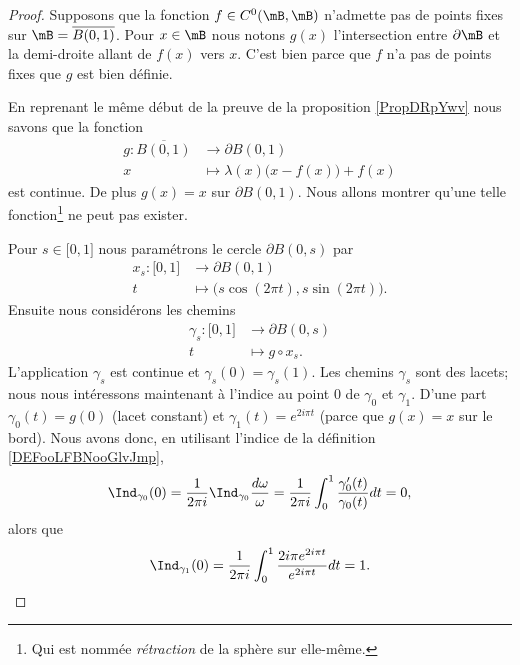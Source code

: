 \begin{proof}
    Supposons que la fonction \( f\in C^0(\mB,\mB)\) n'admette pas de points fixes sur \( \mB=\overline{ B(0,1) }\). Pour \( x\in \mB\) nous notons \( g(x)\) l'intersection entre \( \partial \mB\) et la demi-droite allant de \( f(x)\) vers \( x\). C'est bien parce que \( f\) n'a pas de points fixes que \( g\) est bien définie.

    En reprenant le même début de la preuve de la proposition \ref{PropDRpYwv} nous savons que la fonction
    \begin{equation}
        \begin{aligned}
            g\colon \overline{ B(0,1) }&\to \partial B(0,1) \\
            x&\mapsto \lambda(x)\big( x-f(x) \big)+f(x) 
        \end{aligned}
    \end{equation}
    est continue. De plus \( g(x)=x\) sur \( \partial B(0,1)\). Nous allons montrer qu'une telle fonction\footnote{Qui est nommée \emph{rétraction} de la sphère sur elle-même.} ne peut pas exister.

    Pour \( s\in\mathopen[ 0 , 1 \mathclose]\) nous paramétrons le cercle \( \partial B(0,s)\) par
    \begin{equation}
        \begin{aligned}
            x_s\colon \mathopen[ 0 , 1 \mathclose]&\to \partial B(0,1) \\
            t&\mapsto \big( s\cos(2\pi t),s\sin(2\pi t) \big). 
        \end{aligned}
    \end{equation}
    Ensuite nous considérons les chemins
    \begin{equation}
        \begin{aligned}
            \gamma_s\colon \mathopen[ 0 , 1 \mathclose]&\to \partial B(0,s) \\
            t&\mapsto g\circ x_s. 
        \end{aligned}
    \end{equation}
    L'application \( \gamma_s\) est continue et \( \gamma_s(0)=\gamma_s(1)\). Les chemins \( \gamma_s\) sont des lacets; nous nous intéressons maintenant à l'indice au point \( 0\) de \( \gamma_0\) et \( \gamma_1\). D'une part \( \gamma_0(t)=g(0)\) (lacet constant) et \( \gamma_1(t)= e^{2i\pi t}\) (parce que \( g(x)=x\) sur le bord). Nous avons donc, en utilisant l'indice de la définition \ref{DEFooLFBNooGlvJmp},
    \begin{equation}
        \Ind_{\gamma_0}(0)=\frac{1}{ 2\pi i }\Ind_{\gamma_0}\frac{ d\omega }{ \omega }=\frac{1}{ 2\pi i }\int_0^1\frac{ \gamma_0'(t) }{ \gamma_0(t) }dt=0,
    \end{equation}
    alors que
    \begin{equation}
        \Ind_{\gamma_1}(0)=\frac{1}{ 2\pi i }\int_0^1\frac{ 2i\pi e^{2i\pi t} }{  e^{2i\pi t} }dt=1.
    \end{equation}
    

\end{proof}
